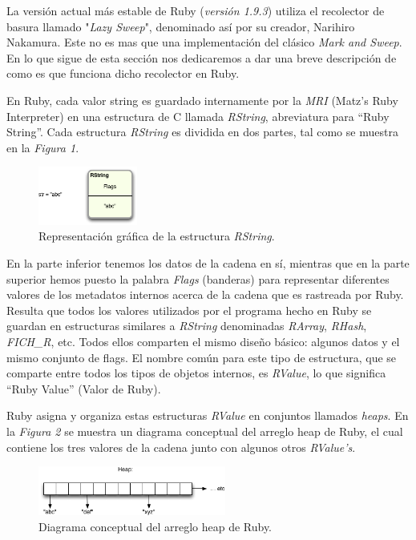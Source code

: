 \documentclass{article}
\begin{document}
	La versión actual más estable de Ruby (\textit{versión 1.9.3}) utiliza el recolector de basura llamado "\textit{Lazy Sweep}", denominado así por su creador, Narihiro Nakamura. Este no es mas que una implementación del clásico \textit{Mark and Sweep}. En lo que sigue de esta sección nos dedicaremos a dar una breve descripción de como es que funciona dicho recolector en Ruby.
	\par
	En Ruby, cada valor string es guardado internamente por la \textit{MRI} (Matz's Ruby Interpreter) en una estructura de C llamada \textit{RString}, abreviatura para ``Ruby String''. Cada estructura \textit{RString} es dividida en dos partes, tal como se muestra en la \textit{Figura 1}.
\bigskip

\begin{figure}[h]
	\centering
	\includegraphics[width=0.29\textwidth]{images/gc/gc01-rstring.png}
	\caption{Representación gráfica de la estructura \textit{RString}.}
\end{figure}
\bigskip

\noindent En la parte inferior tenemos los datos de la cadena en sí, mientras que en la parte superior hemos puesto la palabra \textit{Flags} (banderas) para representar diferentes valores de los metadatos internos acerca de la cadena que es rastreada por Ruby. Resulta que todos los valores utilizados por el programa hecho en Ruby se guardan en estructuras similares a \textit{RString} denominadas \textit{RArray}, \textit{RHash}, \textit{FICH\_R}, etc. Todos ellos comparten el mismo diseño básico: algunos datos y el mismo conjunto de flags. El nombre común para este tipo de estructura, que se comparte entre todos los tipos de objetos internos, es \textit{RValue}, lo que significa ``Ruby Value'' (Valor de Ruby).
	\par
	Ruby asigna y organiza estas estructuras \textit{RValue} en conjuntos llamados \textit{heaps}. En la \textit{Figura 2} se muestra un diagrama conceptual del arreglo heap de Ruby, el cual contiene los tres valores de la cadena junto con algunos otros \textit{RValue's}.
\bigskip

\begin{figure}[h]
	\centering
	\includegraphics[width=0.55\textwidth]{images/gc/gc02-heap.png}
	\caption{Diagrama conceptual del arreglo heap de Ruby.}
\end{figure}
\bigskip
\end{document}
